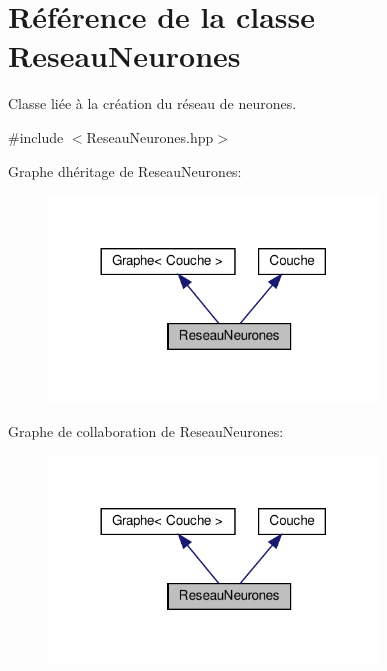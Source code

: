 \hypertarget{class_reseau_neurones}{}\section{Référence de la classe Reseau\+Neurones}
\label{class_reseau_neurones}


Classe liée à la création du réseau de neurones.  




{\ttfamily \#include $<$Reseau\+Neurones.\+hpp$>$}



Graphe d\textquotesingle{}héritage de Reseau\+Neurones\+:\nopagebreak
\begin{figure}[H]
\begin{center}
\leavevmode
\includegraphics[width=248pt]{class_reseau_neurones__inherit__graph}
\end{center}
\end{figure}


Graphe de collaboration de Reseau\+Neurones\+:\nopagebreak
\begin{figure}[H]
\begin{center}
\leavevmode
\includegraphics[width=248pt]{class_reseau_neurones__coll__graph}
\end{center}
\end{figure}
